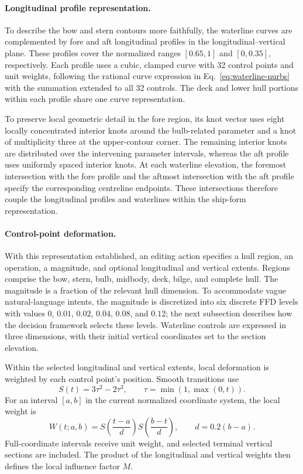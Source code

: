\documentclass[a4paper,fleqn]{cas-dc}
\begin{document}
\paragraph{Longitudinal profile representation.}
To describe the bow and stern contours more faithfully, the waterline curves are
complemented by fore and aft longitudinal profiles in the longitudinal--vertical
plane. These profiles cover the normalized ranges $[0.65,1]$ and $[0,0.35]$,
respectively. Each profile uses a cubic, clamped curve with 32 control points and
unit weights, following the rational curve expression in
Eq.~\ref{eq:waterline-nurbs} with the summation extended to all 32 controls. The
deck and lower hull portions within each profile share one curve representation.

To preserve local geometric detail in the fore region, its knot vector uses eight
locally concentrated interior knots around the bulb-related parameter and a knot
of multiplicity three at the upper-contour corner. The remaining interior knots
are distributed over the intervening parameter intervals, whereas the aft profile
uses uniformly spaced interior knots. At each waterline elevation, the foremost
intersection with the fore profile and the aftmost intersection with the aft
profile specify the corresponding centreline endpoints. These intersections
therefore couple the longitudinal profiles and waterlines within the ship-form
representation.

\paragraph{Control-point deformation.}
With this representation established, an editing action specifies a hull region,
an operation, a magnitude, and optional longitudinal and vertical extents. Regions
comprise the bow, stern, bulb, midbody, deck, bilge, and complete hull. The
magnitude is a fraction of the relevant hull dimension. To accommodate vague
natural-language intents, the magnitude is discretized into six discrete FFD
levels with values $0$, $0.01$, $0.02$, $0.04$, $0.08$, and $0.12$; the next
subsection describes how the decision framework selects these levels. Waterline
controls are expressed in three dimensions, with their initial vertical
coordinates set to the section elevation.

Within the selected longitudinal and vertical extents, local deformation is
weighted by each control point's position. Smooth transitions use
\begin{equation}
 S(t)=3\tau^2-2\tau^3,
 \qquad \tau=\min(1,\max(0,t)).
 \label{eq:smooth-transition}
\end{equation}
For an interval $[a,b]$ in the current normalized coordinate system, the local
weight is
\begin{equation}
 W(t;a,b)=S\!\left(\frac{t-a}{d}\right)
           S\!\left(\frac{b-t}{d}\right),
 \qquad d=0.2(b-a).
 \label{eq:local-window}
\end{equation}
Full-coordinate intervals receive unit weight, and selected terminal vertical
sections are included. The product of the longitudinal and vertical weights then
defines the local influence factor $M$.
\end{document}
